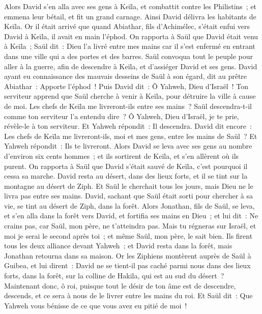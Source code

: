 \begin{multicols}{2}
Alors David s'en alla avec ses gens à Keïla, et combattit contre les Philistins~; et emmena leur bétail, et fit un grand carnage. Ainsi David délivra les habitants de Keïla.
Or il était arrivé que quand Abiathar, fils d'Achimélec, s'était enfui vers David à Keïla, il avait en main l'éphod.
On rapporta à Saül que David était venu à Keïla~; Saül dit~: Dieu l'a livré entre mes mains car il s'est enfermé en entrant dans une ville qui a des portes et des barres.
Saül convoqua tout le peuple pour aller à la guerre, afin de descendre à Keïla, et d'assiéger David et ses gens.
David ayant eu connaissance des mauvais desseins de Saül à son égard, dit au prêtre Abiathar~: Apporte l'éphod~!
Puis David dit~: Ô Yahweh, Dieu d'Israël~! Ton serviteur apprend que Saül cherche à venir à Keïla, pour détruire la ville à cause de moi.
Les chefs de Keïla me livreront-ils entre ses mains~? Saül descendra-t-il comme ton serviteur l'a entendu dire~? Ô Yahweh, Dieu d'Israël, je te prie, révèle-le à ton serviteur. Et Yahweh répondit~: Il descendra.
David dit encore~: Les chefs de Keïla me livreront-ils, moi et mes gens, entre les mains de Saül~? Et Yahweh répondit~: Ils te livreront.
Alors David se leva avec ses gens au nombre d'environ six cents hommes~; et ils sortirent de Keïla, et s'en allèrent où ils purent. On rapporta à Saül que David s'était sauvé de Keïla, c'est pourquoi il cessa sa marche.
David resta au désert, dans des lieux forts, et il se tint sur la montagne au désert de Ziph. Et Saül le cherchait tous les jours, mais Dieu ne le livra pas entre ses mains.
David, sachant que Saül était sorti pour chercher à sa vie, se tint au désert de Ziph, dans la forêt.
Alors Jonathan, fils de Saül, se leva, et s'en alla dans la forêt vers David, et fortifia ses mains en Dieu~;
et lui dit~: Ne crains pas, car Saül, mon père, ne t'atteindra pas. Mais tu régneras sur Israël, et moi je serai le second après toi~; et même Saül, mon père, le sait bien.
Ils firent tous les deux alliance devant Yahweh~; et David resta dans la forêt, mais Jonathan retourna dans sa maison.
Or les Ziphiens montèrent auprès de Saül à Guibea, et lui dirent~: David ne se tient-il pas caché parmi nous dans des lieux forts, dans la forêt, sur la colline de Hakila, qui est au sud du désert~?
Maintenant donc, ô roi, puisque tout le désir de ton âme est de descendre, descends, et ce sera à nous de le livrer entre les mains du roi.
Et Saül dit~: Que Yahweh vous bénisse de ce que vous avez eu pitié de moi~!

\end{multicols}
